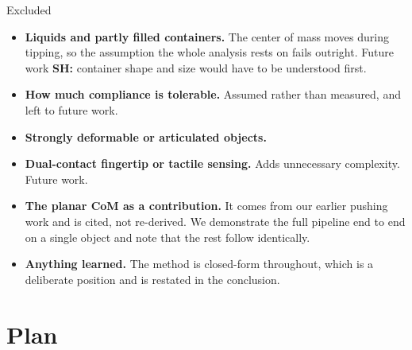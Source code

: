 \documentclass[10pt, conference]{IEEEtran}
\newcommand{\sh}[1]{\textcolor{orange!90!black}{\textbf{SH:} #1}}
\begin{document}
\begin{keybox}{Excluded}
\begin{itemize}[leftmargin=*, itemsep=1pt]
  \item \textbf{Liquids and partly filled containers.} The center of mass moves during tipping, so the assumption the whole analysis rests on fails outright. Future work \sh{container shape and size would have to be understood first.}
  \item \textbf{How much compliance is tolerable.} Assumed rather than measured, and left to future work.
  \item \textbf{Strongly deformable or articulated objects.}
  \item \textbf{Dual-contact fingertip or tactile sensing.} Adds unnecessary complexity. Future work.
  \item \textbf{The planar CoM as a contribution.} It comes from our earlier pushing work and is cited, not re-derived. We demonstrate the full pipeline end to end on a single object and note that the rest follow identically.
  \item \textbf{Anything learned.} The method is closed-form throughout, which is a deliberate position and is restated in the conclusion.
\end{itemize}
\end{keybox}

\section{Plan}
\end{document}
